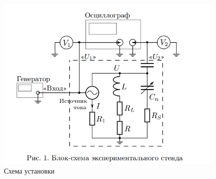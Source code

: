 \documentclass[a4paper, 12pt]{article}
\begin{document}
\begin{center}
\begin{figure}[ht]
\includegraphics[width = 1\textwidth]{Снимок экрана 2024-10-25 191509.png}
\caption{Схема установки}
\end{figure}
\end{center}
\end{document}
